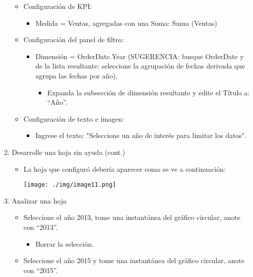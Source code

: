 \documentclass[12pt,letterpaper]{article}
\begin{document}
\begin{enumerate}
\begin{itemize}
\begin{itemize}
        \end{itemize}   
        \item Configuración de KPI:
        \begin{itemize}
            \item Medida = Ventas, agregadas con una Suma: Suma (Ventas)
        \end{itemize} 
        \item Configuración del panel de filtro:
        \begin{itemize}    
            \item Dimensión = OrderDate.Year (SUGERENCIA: busque OrderDate y de la lista resultante: seleccione la agrupación de fechas derivada que agrupa las fechas por año).
            \begin{itemize}      
                \item Expanda la subsección de dimensión resultante y edite el Título a: “Año”.
            \end{itemize} 
        \end{itemize} 
        \item Configuración de texto e imagen:
        \begin{itemize}  
            \item Ingrese el texto: "Seleccione un año de interés para limitar los datos".
        \end{itemize} 
    \end{itemize}  
    \item Desarrolle una hoja sin ayuda (cont.)
    \begin{itemize}  
        \item La hoja que configuró debería aparecer como se ve a continuación:
        \begin{center}
            \texttt{[image: ./img/image11.png]} 
        \end{center}
    \end{itemize} 
    \item Analizar una hoja
    \begin{itemize}  
        \item Seleccione el año 2013, tome una instantánea del gráfico circular, anote con “2013”.
        \begin{itemize}  
            \item Borrar la selección.
        \end{itemize} 
        \item Seleccione el año 2015 y tome una instantánea del gráfico circular, anote con “2015”.

\end{itemize}
\end{enumerate}
\end{document}
